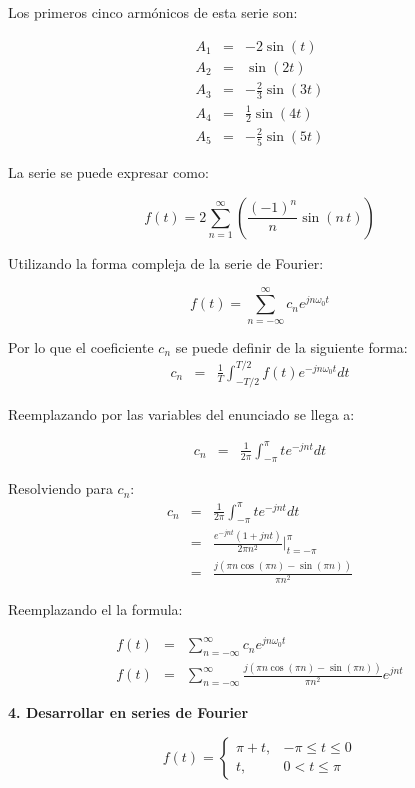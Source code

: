 \documentclass[a4paper]{article}
\begin{document}
Los primeros cinco armónicos de esta serie son:

\begin{eqnarray*}
A_1 &=& - 2\sin{(t)} \\
A_2 &=& \sin{(2t)} \\
A_3 &=& - \frac{2}{3}\sin{(3t)} \\
A_4 &=& \frac{1}{2}\sin{(4t)} \\
A_5 &=& - \frac{2}{5}\sin{(5t)}
\end{eqnarray*}

La serie se puede expresar como:

$$f(t) = 2 \sum_{n=1}^\infty\left(\frac{(-1)^n}{n}\sin{(n\,t)}\right)$$

Utilizando la forma compleja de la serie de Fourier:

$$f(t) =  \sum_{n=-\infty}^\infty c_n e^{jn\omega_0t} $$

Por lo que el coeficiente $c_n$ se puede definir de la siguiente forma:
\begin{eqnarray*}
c_n &=& \frac{1}{T}\int_{-T/2}^{T/2}f(t)e^{-jn\omega_0t}dt
\end{eqnarray*}

Reemplazando por las variables del enunciado se llega a:

\begin{eqnarray*}
c_n &=& \frac{1}{2\pi}\int_{-\pi}^{\pi}te^{-jnt}dt
\end{eqnarray*}

Resolviendo para $c_n$:
\begin{eqnarray*}
c_n &=& \frac{1}{2\pi}\int_{-\pi}^{\pi}te^{-jnt}dt\\
&=& \frac{e^{-jnt}(1+jnt)}{2\pi n^2}\bigg|_{t=-\pi}^{\pi}\\
&=& \frac{j(\pi n\cos(\pi n) - \sin(\pi n))}{\pi n^2}
\end{eqnarray*}

Reemplazando el la formula:

\begin{eqnarray*}
f(t) &=&  \sum_{n=-\infty}^\infty c_n e^{jn\omega_0t} \\
f(t) &=&  \sum_{n=-\infty}^\infty \frac{j(\pi n\cos(\pi n) - \sin(\pi n))}{\pi n^2} e^{jnt}
\end{eqnarray*}

\textbf{4. Desarrollar en series de Fourier}

$$f(t) = \begin{cases}
\pi +t, &-\pi \leq t \leq 0\\
t, &0 < t \leq \pi
\end{cases}$$
\end{document}
